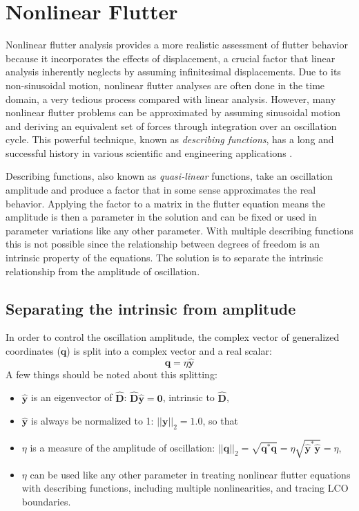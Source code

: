 \documentclass[10pt,openany,twoside]{book}
\numberwithin{equation}{section}   %
\newcommand{\Newterm}[1]{{\em #1}}
\newcommand{\Matrix}[1]{\boldsymbol{#1}}
\newcommand{\Vector}[1]{\boldsymbol{#1}}
\begin{document}
\chapter{Nonlinear Flutter}\label{chap:nonlinear}
Nonlinear flutter analysis
provides a more realistic assessment of flutter behavior because it incorporates
the effects of displacement, a crucial factor that linear analysis
inherently neglects by assuming infinitesimal displacements.
Due to its non-sinusoidal motion, nonlinear flutter analyses are often
done in the time domain, a very tedious process compared with linear analysis.
However, many nonlinear flutter problems can be approximated by assuming
sinusoidal motion and deriving an equivalent set of forces through
integration over an oscillation cycle. This powerful technique, known
as \Newterm{describing functions},
has a long and successful history in various
scientific and engineering applications \cite{gelb1968multiple}.

Describing functions, also known as \Newterm{quasi-linear} functions,
take an oscillation amplitude and produce a factor that in some sense
approximates the real behavior. Applying the factor to a matrix in
the flutter equation means the amplitude is then a parameter in the
solution and can be fixed or used in parameter variations like any
other parameter. With multiple describing functions this is not possible
since the relationship between degrees of freedom is an intrinsic
property of the equations. The solution is to separate the intrinsic
relationship from the amplitude of oscillation.

\section{Separating the intrinsic from amplitude}\label{sect:separation}
In order to control the oscillation amplitude, the complex vector of
generalized coordinates ($\Vector{q}$) is split into a complex vector
and a real scalar:
\begin{equation}\label{eqn:eta-def}
	\Vector{q} = \eta \Vector{\hat{y}}
\end{equation}
A few things should be noted about this splitting:
\begin{itemize}
	\item $\Vector{\hat{y}}$ is an eigenvector of $\hat{\Matrix{D}}$:
		$\hat{\Matrix{D}}\hat{\Vector{y}} = \Vector{0}$,
			intrinsic to $\hat{\Matrix{D}}$,
	\item $\Vector{\hat{y}}$ is always be normalized to 1:
		$||\Vector{y}||_2 = 1.0$, so that
	\item $\eta$ is a measure of the amplitude of oscillation:
		$||\Vector{q}||_2 = \sqrt{\Vector{q}^*\Vector{q}} =
			\eta\sqrt{\Vector{\hat{y}}^*\Vector{\hat{y}}} = \eta$,
	\item $\eta$ can be used like any other parameter in treating nonlinear
		flutter equations with describing functions, including multiple
		nonlinearities, and tracing LCO boundaries.
\end{itemize}
\end{document}
